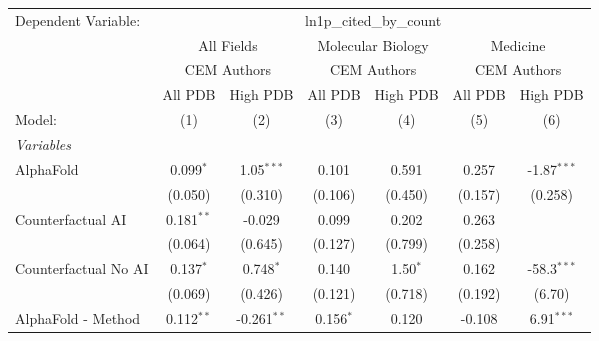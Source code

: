 \begingroup
\centering
\begin{tabular}{lcccccc}
   \tabularnewline \midrule \midrule
   Dependent Variable: & \multicolumn{6}{c}{ln1p\_cited\_by\_count}\\
 & \multicolumn{2}{c}{All Fields} & \multicolumn{2}{c}{Molecular Biology} & \multicolumn{2}{c}{Medicine} \\
\cmidrule(lr){2-3} \cmidrule(lr){4-5} \cmidrule(lr){6-7}
 & \multicolumn{2}{c}{CEM Authors} & \multicolumn{2}{c}{CEM Authors} & \multicolumn{2}{c}{CEM Authors} \\
\cmidrule(lr){2-3} \cmidrule(lr){4-5} \cmidrule(lr){6-7}
 & \multicolumn{1}{c}{All PDB} & \multicolumn{1}{c}{High PDB} & \multicolumn{1}{c}{All PDB} & \multicolumn{1}{c}{High PDB} & \multicolumn{1}{c}{All PDB} & \multicolumn{1}{c}{High PDB} \\
\cmidrule(lr){2-2} \cmidrule(lr){3-3} \cmidrule(lr){4-4} \cmidrule(lr){5-5} \cmidrule(lr){6-6} \cmidrule(lr){7-7}
   Model:                                                     & (1)           & (2)           & (3)           & (4)        & (5)            & (6)\\  
   \midrule
   \emph{Variables}\\
   AlphaFold                                                  & 0.099$^{*}$   & 1.05$^{***}$  & 0.101         & 0.591      & 0.257          & -1.87$^{***}$\\   
                                                              & (0.050)       & (0.310)       & (0.106)       & (0.450)    & (0.157)        & (0.258)\\   
   Counterfactual AI                                          & 0.181$^{**}$  & -0.029        & 0.099         & 0.202      & 0.263          &   \\   
                                                              & (0.064)       & (0.645)       & (0.127)       & (0.799)    & (0.258)        &   \\   
   Counterfactual No AI                                       & 0.137$^{*}$   & 0.748$^{*}$   & 0.140         & 1.50$^{*}$ & 0.162          & -58.3$^{***}$\\   
                                                              & (0.069)       & (0.426)       & (0.121)       & (0.718)    & (0.192)        & (6.70)\\   
   AlphaFold - Method                                         & 0.112$^{**}$  & -0.261$^{**}$ & 0.156$^{*}$   & 0.120      & -0.108         & 6.91$^{***}$\\   

\end{tabular}
